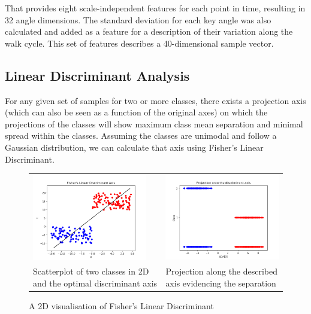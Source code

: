 \documentclass{bmvc2k}
\begin{document}
That provides eight scale-independent features for each point in time, resulting in 32 angle dimensions. The standard deviation  for each key angle was also calculated and added as a feature for a description of their variation along the walk cycle. This set of features describes a 40-dimensional sample vector.

\subsection{Linear Discriminant Analysis}

For any given set of samples for two or more classes, there exists a projection axis (which can also be seen as a function of the original axes) on which the projections of the classes will show maximum class mean separation and minimal spread within the classes\cite{fisher}. Assuming the classes are unimodal and follow a Gaussian distribution, we can calculate that axis using Fisher's Linear Discriminant.

\begin{figure}[H]
   \begin{center}
      \begin{tabular}{p{5cm} p{5cm}}
         \includegraphics[width=5cm]{figures/fisher2classes.png}&\includegraphics[width=5cm]{figures/fisherProjection2classes.png}\\
         Scatterplot of two classes in 2D and the optimal discriminant axis&Projection along the described axis evidencing the separation
      \end{tabular}
   \end{center}
   \caption{A 2D visualisation of Fisher's Linear Discriminant}
\end{figure}
\end{document}
